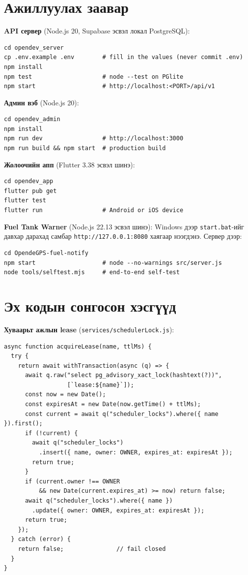 \documentclass[
12pt,
oneside,
english,
onehalfspacing,
nolistspacing,
headsepline,
]{MUST-Thesis}
\begin{document}
\section{Ажиллуулах заавар}\label{app:run}

\textbf{API сервер} (Node.js 20, Supabase эсвэл локал PostgreSQL):
\begin{verbatim}
cd opendev_server
cp .env.example .env        # fill in the values (never commit .env)
npm install
npm test                    # node --test on PGlite
npm start                   # http://localhost:<PORT>/api/v1
\end{verbatim}

\textbf{Админ вэб} (Node.js 20):
\begin{verbatim}
cd opendev_admin
npm install
npm run dev                 # http://localhost:3000
npm run build && npm start  # production build
\end{verbatim}

\textbf{Жолоочийн апп} (Flutter 3.38 эсвэл шинэ):
\begin{verbatim}
cd opendev_app
flutter pub get
flutter test
flutter run                 # Android or iOS device
\end{verbatim}

\textbf{Fuel Tank Warner} (Node.js 22.13 эсвэл шинэ): Windows дээр \texttt{start.bat}-ийг давхар дарахад самбар \texttt{http://127.0.0.1:8080} хаягаар нээгдэнэ. Сервер дээр:
\begin{verbatim}
cd OpendeGPS-fuel-notify
npm start                   # node --no-warnings src/server.js
node tools/selftest.mjs     # end-to-end self-test
\end{verbatim}

\section{Эх кодын сонгосон хэсгүүд}\label{app:code}

\textbf{Хуваарьт ажлын lease} (\texttt{services/schedulerLock.js}):
\begin{verbatim}
async function acquireLease(name, ttlMs) {
  try {
    return await withTransaction(async (q) => {
      await q.raw("select pg_advisory_xact_lock(hashtext(?))",
                  [`lease:${name}`]);
      const now = new Date();
      const expiresAt = new Date(now.getTime() + ttlMs);
      const current = await q("scheduler_locks").where({ name }).first();
      if (!current) {
        await q("scheduler_locks")
          .insert({ name, owner: OWNER, expires_at: expiresAt });
        return true;
      }
      if (current.owner !== OWNER
          && new Date(current.expires_at) >= now) return false;
      await q("scheduler_locks").where({ name })
        .update({ owner: OWNER, expires_at: expiresAt });
      return true;
    });
  } catch (error) {
    return false;               // fail closed
  }
}
\end{verbatim}
\end{document}
